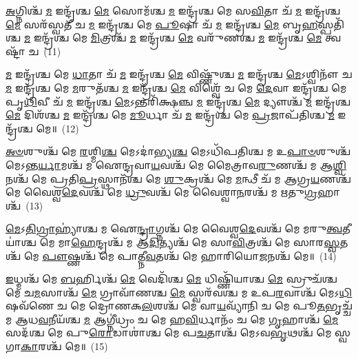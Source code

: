 {\anuvakamend[{\-\ul{𑌕𑍃}\-\-\ul{𑌷𑍍𑌟}\-\-\ul{𑌪}\-𑌚𑍍𑌯\-\ul{𑌞𑍍𑌚𑌾}\-𑌷𑍍𑌟𑌾𑌚᳴𑌤𑍍𑌵𑌾𑌰𑌿𑍞𑌶𑌚𑍍𑌚}]}%

\-\ul{𑌅}\-𑌗𑍍𑌨𑌿𑌶𑍍𑌚᳴ \ul{𑌮} 𑌇𑌨𑍍𑌦𑍍𑌰᳴𑌶𑍍𑌚 \ul{𑌮𑍇} 𑌸𑍋𑌮᳴𑌶𑍍𑌚 \ul{𑌮} 𑌇𑌨𑍍𑌦𑍍𑌰᳴𑌶𑍍𑌚 𑌮𑍇 𑌸\-\ul{𑌵𑌿}\-𑌤𑌾 𑌚᳴ \ul{𑌮} 𑌇𑌨𑍍𑌦𑍍𑌰᳴𑌶𑍍𑌚 \ul{𑌮𑍇} 𑌸𑌰᳴𑌸𑍍𑌵𑌤𑍀 𑌚 \ul{𑌮} 𑌇𑌨𑍍𑌦𑍍𑌰᳴𑌶𑍍𑌚 𑌮𑍇 \ul{𑌪𑍂}\-𑌷𑌾 𑌚᳴ \ul{𑌮} 𑌇𑌨𑍍𑌦𑍍𑌰᳴𑌶𑍍𑌚 \ul{𑌮𑍇} 𑌬𑍃\-\ul{𑌹}\-𑌸𑍍𑌪𑌤𑌿᳴𑌶𑍍𑌚 \ul{𑌮} 𑌇𑌨𑍍𑌦𑍍𑌰᳴𑌶𑍍𑌚 𑌮𑍇 \ul{𑌮𑌿}\-𑌤𑍍𑌰𑌶𑍍𑌚᳴ \ul{𑌮} 𑌇𑌨𑍍𑌦𑍍𑌰᳴𑌶𑍍𑌚 \ul{𑌮𑍇} 𑌵𑌰𑍁᳴𑌣𑌶𑍍𑌚 \ul{𑌮} 𑌇𑌨𑍍𑌦𑍍𑌰᳴𑌶𑍍𑌚 \ul{𑌮𑍇} 𑌤𑍍𑌵𑌷𑍍𑌟𑌾᳴ 𑌚~(11)

\-\ul{𑌮} 𑌇𑌨𑍍𑌦𑍍𑌰᳴𑌶𑍍𑌚 𑌮𑍇 \ul{𑌧𑌾}\-𑌤𑌾 𑌚᳴ \ul{𑌮} 𑌇𑌨𑍍𑌦𑍍𑌰᳴𑌶𑍍𑌚 \ul{𑌮𑍇} 𑌵𑌿𑌷𑍍𑌣𑍁᳴𑌶𑍍𑌚 \ul{𑌮} 𑌇𑌨𑍍𑌦𑍍𑌰᳴𑌶𑍍𑌚 \ul{𑌮𑍇}\-\-𑌽𑌶𑍍𑌵𑌿𑌨𑍗᳴ 𑌚 \ul{𑌮} 𑌇𑌨𑍍𑌦𑍍𑌰᳴𑌶𑍍𑌚 𑌮𑍇 \ul{𑌮}\-𑌰𑍁𑌤᳴𑌶𑍍𑌚 \ul{𑌮} 𑌇𑌨𑍍𑌦𑍍𑌰᳴𑌶𑍍𑌚 \ul{𑌮𑍇} 𑌵𑌿𑌶𑍍𑌵𑍇᳴ 𑌚 𑌮𑍇 \ul{𑌦𑍇}\-𑌵𑌾 𑌇𑌨𑍍𑌦𑍍𑌰᳴𑌶𑍍𑌚 𑌮𑍇 𑌪𑍃\-\ul{𑌥𑌿}\-𑌵𑍀 𑌚᳴ \ul{𑌮} 𑌇𑌨𑍍𑌦𑍍𑌰᳴𑌶𑍍𑌚 \ul{𑌮𑍇}\-\-𑌽𑌨𑍍𑌤𑌰𑌿᳴𑌕𑍍𑌷𑌞𑍍𑌚 \ul{𑌮} 𑌇𑌨𑍍𑌦𑍍𑌰᳴𑌶𑍍𑌚 \ul{𑌮𑍇} 𑌦𑍍𑌯𑍗𑌶𑍍𑌚᳴ \ul{𑌮} 𑌇𑌨𑍍𑌦𑍍𑌰᳴𑌶𑍍𑌚 \ul{𑌮𑍇} 𑌦𑌿𑌶᳴𑌶𑍍𑌚 \ul{𑌮} 𑌇𑌨𑍍𑌦𑍍𑌰᳴𑌶𑍍𑌚 𑌮𑍇 \ul{𑌮𑍂}\-𑌰𑍍𑌧𑌾 𑌚᳴ \ul{𑌮} 𑌇𑌨𑍍𑌦𑍍𑌰᳴𑌶𑍍𑌚 𑌮𑍇 \ul{𑌪𑍍𑌰}\-𑌜𑌾𑌪᳴𑌤𑌿𑌶𑍍𑌚 \ul{𑌮} 𑌇𑌨𑍍𑌦𑍍𑌰᳴𑌶𑍍𑌚 𑌮𑍇॥~(12)

{\anuvakamend[{𑌤𑍍𑌵𑌷𑍍𑌟𑌾᳴ \ul{𑌚} 𑌦𑍍𑌯𑍗𑌶𑍍𑌚᳴ \ul{𑌮} 𑌏𑌕᳴𑌵𑌿𑍞𑌶𑌤𑌿𑌶𑍍𑌚}]}%

\-\ul{𑌅}\-\-\ul{𑍞}\-𑌶𑍁𑌶𑍍𑌚᳴ 𑌮𑍇 \ul{𑌰}\-𑌶𑍍𑌮𑌿\-\ul{𑌶𑍍𑌚} 𑌮𑍇\-𑌽𑌦𑌾॑𑌭𑍍𑌯\-\ul{𑌶𑍍𑌚} 𑌮𑍇\-𑌽𑌧𑌿᳴𑌪𑌤𑌿𑌶𑍍𑌚 𑌮 𑌉\-\ul{𑌪𑌾}\-\-\ul{𑍞}\-𑌶𑍁𑌶𑍍𑌚᳴ 𑌮𑍇\-𑌽𑌨𑍍𑌤\-\ul{𑌰𑍍𑌯𑌾}\-𑌮𑌶𑍍𑌚᳴ 𑌮 𑌐𑌨𑍍𑌦𑍍𑌰𑌵𑌾\-\ul{𑌯}\-𑌵𑌶𑍍𑌚᳴ 𑌮𑍇 𑌮𑍈𑌤𑍍𑌰𑌾𑌵\-\ul{𑌰𑍁}\-𑌣𑌶𑍍𑌚᳴ 𑌮 𑌆\-\ul{𑌶𑍍𑌵𑌿}\-𑌨𑌶𑍍𑌚᳴ 𑌮𑍇 𑌪𑍍𑌰𑌤𑌿\-\ul{𑌪𑍍𑌰}\-𑌸𑍍𑌥𑌾𑌨᳴𑌶𑍍𑌚 𑌮𑍇 \ul{𑌶𑍁}\-𑌕𑍍𑌰𑌶𑍍𑌚᳴ 𑌮𑍇 \ul{𑌮}\-𑌨𑍍𑌥𑍀 𑌚᳴ 𑌮 𑌆𑌗𑍍𑌰\-\ul{𑌯}\-𑌣𑌶𑍍𑌚᳴ 𑌮𑍇 𑌵𑍈𑌶𑍍𑌵\-\ul{𑌦𑍇}\-𑌵𑌶𑍍𑌚᳴ 𑌮𑍇 \ul{𑌧𑍍𑌰𑍁}\-𑌵𑌶𑍍𑌚᳴ 𑌮𑍇 𑌵𑍈𑌶𑍍𑌵𑌾\-\ul{𑌨}\-𑌰𑌶𑍍𑌚᳴ 𑌮 𑌋𑌤𑍁\-\ul{𑌗𑍍𑌰}\-𑌹𑌾𑌶𑍍𑌚᳴~(13)

\-\ul{𑌮𑍇}\-\-𑌽\-\ul{𑌤𑌿}\-\-\ul{𑌗𑍍𑌰𑌾}\-𑌹𑍍𑌯𑌾॑𑌶𑍍𑌚 𑌮 𑌐\-\ul{𑌨𑍍𑌦𑍍𑌰𑌾}\-𑌗𑍍𑌨𑌶𑍍𑌚᳴ 𑌮𑍇 𑌵𑍈𑌶𑍍𑌵\-\ul{𑌦𑍇}\-𑌵𑌶𑍍𑌚᳴ 𑌮𑍇 𑌮𑌰𑍁\-\ul{𑌤𑍍𑌵}\-𑌤𑍀𑌯𑌾॑𑌶𑍍𑌚 𑌮𑍇 𑌮𑌾\-\ul{𑌹𑍇}\-𑌨𑍍𑌦𑍍𑌰𑌶𑍍𑌚᳴ 𑌮 𑌆\-\ul{𑌦𑌿}\-𑌤𑍍𑌯𑌶𑍍𑌚᳴ 𑌮𑍇 𑌸𑌾\-\ul{𑌵𑌿}\-𑌤𑍍𑌰𑌶𑍍𑌚᳴ 𑌮𑍇 𑌸𑌾𑌰\-\ul{𑌸𑍍𑌵}\-𑌤𑌶𑍍𑌚᳴ 𑌮𑍇 \ul{𑌪𑍗}\-𑌷𑍍𑌣𑌶𑍍𑌚᳴ 𑌮𑍇 𑌪𑌾𑌤𑍍𑌨𑍀\-\ul{𑌵}\-𑌤𑌶𑍍𑌚᳴ 𑌮𑍇 𑌹𑌾𑌰𑌿𑌯𑍋\-\ul{𑌜}\-𑌨𑌶𑍍𑌚᳴ 𑌮𑍇॥~(14)

{\anuvakamend[{\-\ul{𑌋}\-\-\ul{𑌤𑍁}\-\-\ul{𑌗𑍍𑌰}\-𑌹𑌾\-\ul{𑌶𑍍𑌚} 𑌚𑌤𑍁᳴𑌸𑍍𑌤𑍍𑌰𑌿𑍞𑌶𑌚𑍍𑌚}]}%

\-\ul{𑌇}\-𑌧𑍍𑌮𑌶𑍍𑌚᳴ 𑌮𑍇 \ul{𑌬}\-𑌰𑍍\mbox{}𑌹𑌿𑌶𑍍𑌚᳴ \ul{𑌮𑍇} 𑌵𑍇𑌦𑌿᳴𑌶𑍍𑌚 \ul{𑌮𑍇} 𑌧𑌿𑌷𑍍𑌣𑌿᳴𑌯𑌾𑌶𑍍𑌚 \ul{𑌮𑍇} 𑌸𑍍𑌰𑍁𑌚᳴𑌶𑍍𑌚 𑌮𑍇 𑌚\-\ul{𑌮}\-𑌸𑌾𑌶𑍍𑌚᳴ \ul{𑌮𑍇} 𑌗𑍍𑌰𑌾𑌵𑌾᳴𑌣𑌶𑍍𑌚 \ul{𑌮𑍇} 𑌸𑍍𑌵𑌰᳴𑌵𑌶𑍍𑌚 𑌮 𑌉𑌪\-\ul{𑌰}\-𑌵𑌾𑌶𑍍𑌚᳴ 𑌮𑍇\-𑌽\-\ul{𑌧𑌿}\-𑌷𑌵᳴𑌣𑍇 𑌚 𑌮𑍇 𑌦𑍍𑌰𑍋𑌣𑌕\-\ul{𑌲}\-𑌶𑌶𑍍𑌚᳴ 𑌮𑍇 𑌵𑌾\-\ul{𑌯}\-𑌵𑍍𑌯𑌾᳴𑌨𑌿 𑌚 𑌮𑍇 𑌪𑍂\-\ul{𑌤}\-𑌭𑍃𑌚𑍍𑌚᳴ 𑌮 𑌆𑌧\-\ul{𑌵}\-𑌨𑍀𑌯᳴𑌶𑍍𑌚 \ul{𑌮} 𑌆𑌗𑍍𑌨𑍀॑𑌧𑍍𑌰𑌂 𑌚 𑌮𑍇 𑌹\-\ul{𑌵𑌿}\-𑌰𑍍𑌧𑌾𑌨𑌂᳴ 𑌚 𑌮𑍇 \ul{𑌗𑍃}\-𑌹𑌾𑌶𑍍𑌚᳴ \ul{𑌮𑍇} 𑌸𑌦᳴𑌶𑍍𑌚 𑌮𑍇 𑌪𑍁\-\ul{𑌰𑍋}\-𑌡𑌾𑌶𑌾॑𑌶𑍍𑌚 𑌮𑍇 𑌪\-\ul{𑌚}\-𑌤𑌾𑌶𑍍𑌚᳴ 𑌮𑍇\-𑌽𑌵\-\ul{𑌭𑍃}\-𑌥𑌶𑍍𑌚᳴ 𑌮𑍇 𑌸𑍍𑌵𑌗𑌾\-\ul{𑌕𑌾}\-𑌰𑌶𑍍𑌚᳴ 𑌮𑍇॥~(15)

